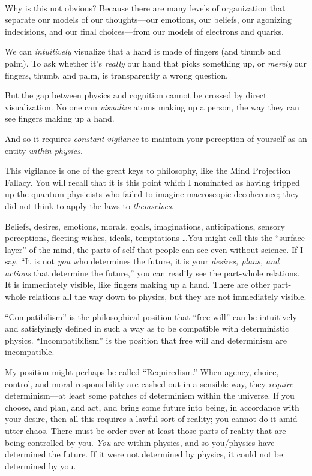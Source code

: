 \bigskip

{
 ~}

{
 Why is this not obvious? Because there are many levels of
organization that separate our models of our thoughts---our emotions,
our beliefs, our agonizing indecisions, and our final choices---from
our models of electrons and quarks.}

{
 We can \textit{intuitively} visualize that a hand is made of
fingers (and thumb and palm). To ask whether it's
\textit{really} our hand that picks something up, or \textit{merely}
our fingers, thumb, and palm, is transparently a wrong question.}

{
 But the gap between physics and cognition cannot be crossed by
direct visualization. No one can \textit{visualize} atoms making up a
person, the way they can see fingers making up a hand.}

{
 And so it requires \textit{constant vigilance} to maintain your
perception of yourself as an entity \textit{within physics}.}

{
 This vigilance is one of the great keys to philosophy, like the
Mind Projection Fallacy. You will recall that it is this point which I
nominated as having tripped up the quantum physicists who failed to
imagine macroscopic decoherence; they did not think to apply the laws
to \textit{themselves}.}

{
 Beliefs, desires, emotions, morals, goals, imaginations,
anticipations, sensory perceptions, fleeting wishes, ideals,
temptations \ldots You might call this the ``surface
layer'' of the mind, the parts-of-self that people
can see even without science. If I say, ``It is not
\textit{you} who determines the future, it is your \textit{desires,
plans, and actions} that determine the future,'' you
can readily see the part-whole relations. It is immediately visible,
like fingers making up a hand. There are other part-whole relations all
the way down to physics, but they are not immediately visible.}

{
 ``Compatibilism'' is the
philosophical position that ``free
will'' can be intuitively and satisfyingly defined in
such a way as to be compatible with deterministic physics.
``Incompatibilism'' is the position
that free will and determinism are incompatible.}

{
 My position might perhaps be called
``Requiredism.'' When agency,
choice, control, and moral responsibility are cashed out in a sensible
way, they \textit{require} determinism---at least some patches of
determinism within the universe. If you choose, and plan, and act, and
bring some future into being, in accordance with your desire, then all
this requires a lawful sort of reality; you cannot do it amid utter
chaos. There must be order over at least those parts of reality that
are being controlled by you. \textit{You} are within physics, and so
you/physics have determined the future. If it were not determined by
physics, it could not be determined by you.}

